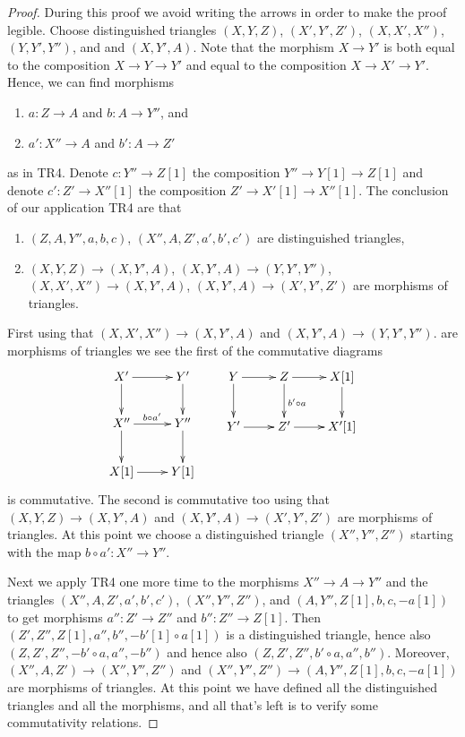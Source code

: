 \begin{proof}
During this proof we avoid writing the arrows in order to make the proof
legible. Choose distinguished triangles
$(X, Y, Z)$, $(X', Y', Z')$, $(X, X', X'')$, $(Y, Y', Y'')$, and
and $(X, Y', A)$. Note that the morphism $X \to Y'$ is both equal
to the composition $X \to Y \to Y'$ and equal to the composition
$X \to X' \to Y'$. Hence, we can find morphisms
\begin{enumerate}
\item $a : Z \to A$ and $b : A \to Y''$, and
\item $a' : X'' \to A$ and $b' : A \to Z'$
\end{enumerate}
as in TR4. Denote $c : Y'' \to Z[1]$ the composition
$Y'' \to Y[1] \to Z[1]$ and denote $c' : Z' \to X''[1]$ the composition
$Z' \to X'[1] \to X''[1]$. The conclusion of our application TR4
are that
\begin{enumerate}
\item $(Z, A, Y'', a, b, c)$, $(X'', A, Z', a', b', c')$
are distinguished triangles,
\item $(X, Y, Z) \to (X, Y', A)$,
$(X, Y', A) \to (Y, Y', Y'')$,
$(X, X', X'') \to (X, Y', A)$,
$(X, Y', A) \to (X', Y', Z')$
are morphisms of triangles.
\end{enumerate}
First using that
$(X, X', X'') \to (X, Y', A)$ and $(X, Y', A) \to (Y, Y', Y'')$.
are morphisms of triangles we see the first of the commutative diagrams
$$
\xymatrix{
X' \ar[r] \ar[d] & Y' \ar[d] \\
X'' \ar[r]^{b \circ a'} \ar[d] & Y'' \ar[d] \\
X[1] \ar[r] & Y[1] 
}
\quad\quad
\xymatrix{
Y \ar[r] \ar[d] & Z \ar[d]^{b' \circ a} \ar[r] & X[1] \ar[d] \\
Y' \ar[r] & Z' \ar[r] & X'[1]
}
$$
is commutative. The second is commutative too using that
$(X, Y, Z) \to (X, Y', A)$ and $(X, Y', A) \to (X', Y', Z')$ are morphisms
of triangles. At this point we choose a distinguished triangle
$(X'', Y'' , Z'')$ starting with the map $b \circ a' : X'' \to Y''$.

\medskip\noindent
Next we apply TR4 one more time to the morphisms
$X'' \to A \to Y''$ and the triangles
$(X'', A, Z', a', b', c')$,
$(X'', Y'', Z'')$, and
$(A, Y'', Z[1], b, c , -a[1])$ to get morphisms
$a'' : Z' \to Z''$ and $b'' : Z'' \to Z[1]$.
Then $(Z', Z'', Z[1], a'', b'', - b'[1] \circ a[1])$ is a distinguished
triangle, hence also $(Z, Z', Z'', -b' \circ a, a'', -b'')$
and hence also $(Z, Z', Z'', b' \circ a, a'', b'')$.
Moreover, $(X'', A, Z') \to (X'', Y'', Z'')$ and
$(X'', Y'', Z'') \to (A, Y'', Z[1], b, c , -a[1])$
are morphisms of triangles.
At this point we have defined all the distinguished triangles
and all the morphisms, and all that's left is to verify some
commutativity relations.


\end{proof}
